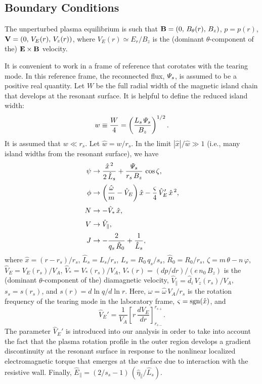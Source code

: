 \documentclass[12pt,prb,aps]{revtex4-1}
\begin{document}
\subsection{Boundary Conditions}
The unperturbed plasma equilibrium is such that
${\bf B} = (0,\,B_\theta(r),\,B_z)$,  $p = p(r)$,
${\bf V} = (0,\,V_E(r),\,V_z(r))$,
where 
$V_E(r)\simeq E_r/B_z$
 is the (dominant $\theta$-component of the) ${\bf E}\times {\bf B}$ velocity. 
 
It is convenient  to work in a frame of reference that corotates with the tearing mode. In this reference frame, the
reconnected flux, ${\mit\Psi}_s$, is assumed to be a positive real
quantity. Let $W$ be the full radial width of the magnetic island chain that develops at the resonant surface. It
is
helpful to define the reduced island width:
\begin{equation}\label{e26a}
w \equiv \frac{W}{4}= \left(\frac{L_s\,{\mit\Psi}_s}{B_z}\right)^{1/2}.
\end{equation}
It is assumed that $w\ll r_s$. Let $\hat{w}=w/r_s$. 
 In the limit $|\hat{x}|/\hat{w}\gg 1$ (i.e., many island widths from the resonant surface), we have  
\begin{align}\label{e26}
\psi &\rightarrow \frac{\hat{x}^{\,2}}{2\,\hat{L}_s} + \frac{{\mit\Psi}_s}{r_s\,B_z}\,\cos\zeta,\\[0.5ex]
\phi &\rightarrow \left(\frac{\hat{\omega}}{m}- \hat{V}_E\right)\hat{x} - \frac{\varsigma}{4}\,\hat{V}_E'\,\hat{x}^{\,2},\\[0.5ex]
N &\rightarrow -\hat{V}_\ast\,\hat{x},\\[0.5ex]
V&\rightarrow \hat{V}_\parallel,\\[0.5ex]
J& \rightarrow -\frac{2}{q_s\,\hat{R}_0} + \frac{1}{\hat{L}_s},\label{e30}
\end{align}
where 
$\hat{x}=(r-r_s)/r_s$,
 $\hat{L}_s=L_s/r_s$,  $L_s=R_0\,q_s/s_s$, $\hat{R}_0=R_0/r_s$, $\zeta=m\,\theta-n\,\varphi$, 
  $\hat{V}_E= V_E(r_s)/V_A$,
$\hat{V}_\ast= V_\ast(r_s)/V_A$,
$V_\ast(r) = (dp/dr)/(e\,n_0\,B_z)$ 
is the (dominant $\theta$-component of the) diamagnetic velocity,
 $\hat{V}_\parallel=\hat{d}_i\, V_z(r_s)/V_A$, $s_s=s(r_s)$, and $s(r)=d\ln q/d\ln r$. 
Here, $\omega = \hat{\omega}\,V_A/r_s$ is the rotation frequency of the tearing mode  in the
laboratory frame,
$\varsigma = {\rm sgn}(\hat{x})$,
and 
\begin{equation}
\hat{V}_E' = \frac{1}{V_A}\left[r\,\frac{dV_E}{dr}\right]_{r_{s-}}^{r_{s+}}.
\end{equation}
The parameter $\hat{V}_E'$ is introduced  into our analysis in order to take into account the fact that the plasma rotation profile in the outer region develops a
gradient discontinuity at the resonant surface in response to the nonlinear localized electromagnetic torque that emerges 
at the surface due to interaction with the resistive wall.\cite{fw} Finally, 
 $\hat{E}_\parallel =(2/s_s-1) \,(\hat{\eta}_\parallel/\hat{L}_s)$.
 
\end{document}
